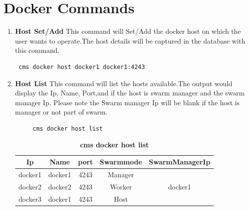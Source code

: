 \documentclass[9pt,twocolumn,twoside]{../../styles/osajnl}
\begin{document}
\section{Docker Commands}
\begin{enumerate}
    \item\textbf{Host Set/Add}
     This command will Set/Add the docker host on which the user wants to operate.The host details will be captured in the database with this command.
    \begin{verbatim} cms docker host docker1 docker1:4243 \end{verbatim}    
    \item \textbf{Host List}
     This command will list the hosts available.The output would display the Ip, Name, Port,and if the host is swarm manager and the swarm manager Ip. Please note the Swarm manager Ip will be blank if the host is manager or not part of swarm. 
     \begin{verbatim}
     cms docker host list 
     \end{verbatim}    
     \begin{table}[h!]
     \caption{\bf cms docker host list }
     \begin{tabular}{ccccc}
     \hline
      Ip & Name & port & Swarmmode &SwarmManagerIp\\
      \hline
      docker1 & docker1 & 4243 & Manager & \\
      docker2 & docker2 & 4243 & Worker & docker1\\
      docker3 & docker1 & 4243 & Host & \\
     \hline
     \end{tabular}
     \label{tab:tab1}
     \end{table}
     

\end{enumerate}
\end{document}
